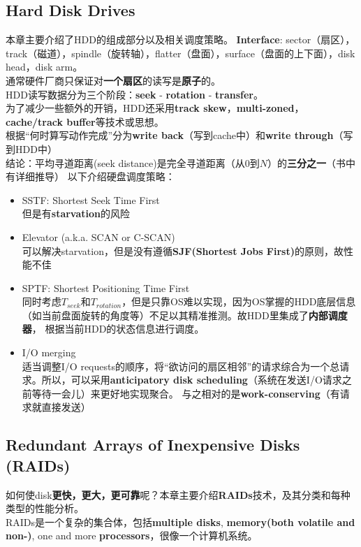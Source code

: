 \documentclass{article}
\begin{document}
\subsection{Hard Disk Drives}
本章主要介绍了HDD的组成部分以及相关调度策略。
\textbf{Interface}: sector（扇区），track（磁道），spindle（旋转轴），flatter（盘面），surface（盘面的上下面），disk head，disk arm。\\
通常硬件厂商只保证对\textbf{一个扇区}的读写是\textbf{原子}的。\\
HDD读写数据分为三个阶段：\textbf{seek} - \textbf{rotation} - \textbf{transfer}。 \\
为了减少一些额外的开销，HDD还采用\textbf{track skew}，\textbf{multi-zoned}，\textbf{cache/track buffer}等技术或思想。\\
根据“何时算写动作完成”分为\textbf{write back}（写到cache中）和\textbf{write through}（写到HDD中）\\
结论：平均寻道距离(seek distance)是完全寻道距离（从$0$到$N$）的\textbf{三分之一}（书中有详细推导）
以下介绍硬盘调度策略：
\begin{itemize}
    \item SSTF: Shortest Seek Time First \\
    但是有\textbf{starvation}的风险
    \item Elevator (a.k.a. SCAN or C-SCAN) \\
    可以解决starvation，但是没有遵循\textbf{SJF(Shortest Jobs First)}的原则，故性能不佳
    \item SPTF: Shortest Positioning Time First \\
    同时考虑$T_{seek}$和$T_{rotation}$，但是只靠OS难以实现，因为OS掌握的HDD底层信息（如当前盘面旋转的角度等）不足以其精准推测。故HDD里集成了\textbf{内部调度器}，
    根据当前HDD的状态信息进行调度。
    \item I/O merging \\
    适当调整I/O requests的顺序，将“欲访问的扇区相邻”的请求综合为一个总请求。所以，可以采用\textbf{anticipatory disk scheduling}（系统在发送I/O请求之前等待一会儿）来更好地实现聚合。
    与之相对的是\textbf{work-conserving}（有请求就直接发送）
\end{itemize}
\subsection{Redundant Arrays of Inexpensive Disks  (RAIDs)}
如何使disk\textbf{更快，更大，更可靠}呢？本章主要介绍\textbf{RAIDs}技术，及其分类和每种类型的性能分析。\\
\indent RAIDs是一个复杂的集合体，包括\textbf{multiple disks}, \textbf{memory(both volatile and non-)}, one and more \textbf{processors}，很像一个计算机系统。 \\
\end{document}
